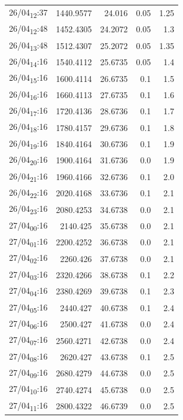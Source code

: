 \documentclass[11pt]{article}
\begin{document}
\begin{table}[htbp]
\begin{tabular}{lrrrr}
26/04\textsubscript{12}:37 & 1440.9577 & 24.016 & 0.05 & 1.25\\[0pt]
26/04\textsubscript{12}:48 & 1452.4305 & 24.2072 & 0.05 & 1.3\\[0pt]
26/04\textsubscript{13}:48 & 1512.4307 & 25.2072 & 0.05 & 1.35\\[0pt]
26/04\textsubscript{14}:16 & 1540.4112 & 25.6735 & 0.05 & 1.4\\[0pt]
26/04\textsubscript{15}:16 & 1600.4114 & 26.6735 & 0.1 & 1.5\\[0pt]
26/04\textsubscript{16}:16 & 1660.4113 & 27.6735 & 0.1 & 1.6\\[0pt]
26/04\textsubscript{17}:16 & 1720.4136 & 28.6736 & 0.1 & 1.7\\[0pt]
26/04\textsubscript{18}:16 & 1780.4157 & 29.6736 & 0.1 & 1.8\\[0pt]
26/04\textsubscript{19}:16 & 1840.4164 & 30.6736 & 0.1 & 1.9\\[0pt]
26/04\textsubscript{20}:16 & 1900.4164 & 31.6736 & 0.0 & 1.9\\[0pt]
26/04\textsubscript{21}:16 & 1960.4166 & 32.6736 & 0.1 & 2.0\\[0pt]
26/04\textsubscript{22}:16 & 2020.4168 & 33.6736 & 0.1 & 2.1\\[0pt]
26/04\textsubscript{23}:16 & 2080.4253 & 34.6738 & 0.0 & 2.1\\[0pt]
27/04\textsubscript{00}:16 & 2140.425 & 35.6738 & 0.0 & 2.1\\[0pt]
27/04\textsubscript{01}:16 & 2200.4252 & 36.6738 & 0.0 & 2.1\\[0pt]
27/04\textsubscript{02}:16 & 2260.426 & 37.6738 & 0.0 & 2.1\\[0pt]
27/04\textsubscript{03}:16 & 2320.4266 & 38.6738 & 0.1 & 2.2\\[0pt]
27/04\textsubscript{04}:16 & 2380.4269 & 39.6738 & 0.1 & 2.3\\[0pt]
27/04\textsubscript{05}:16 & 2440.427 & 40.6738 & 0.1 & 2.4\\[0pt]
27/04\textsubscript{06}:16 & 2500.427 & 41.6738 & 0.0 & 2.4\\[0pt]
27/04\textsubscript{07}:16 & 2560.4271 & 42.6738 & 0.0 & 2.4\\[0pt]
27/04\textsubscript{08}:16 & 2620.427 & 43.6738 & 0.1 & 2.5\\[0pt]
27/04\textsubscript{09}:16 & 2680.4279 & 44.6738 & 0.0 & 2.5\\[0pt]
27/04\textsubscript{10}:16 & 2740.4274 & 45.6738 & 0.0 & 2.5\\[0pt]
27/04\textsubscript{11}:16 & 2800.4322 & 46.6739 & 0.0 & 2.5\\[0pt]

\end{tabular}
\end{table}
\end{document}

